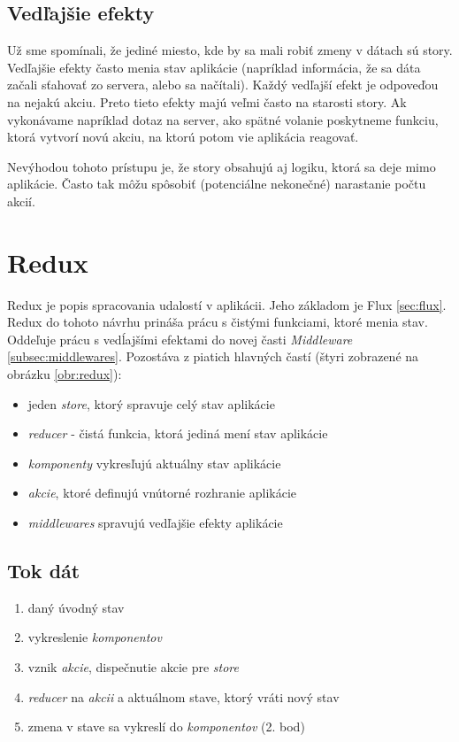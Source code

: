 \subsection{Vedľajšie efekty} 
\NEW{}
Už sme spomínali, že jediné miesto, kde by sa mali robiť zmeny v dátach sú story. Vedľajšie efekty často menia stav aplikácie (napríklad informácia, že sa dáta začali sťahovať zo servera, alebo sa načítali). Každý vedľajší efekt je odpoveďou na nejakú akciu. Preto tieto efekty majú veľmi často na starosti story. Ak vykonávame napríklad dotaz na server, ako spätné volanie poskytneme funkciu, ktorá vytvorí novú akciu, na ktorú potom vie aplikácia reagovať.

Nevýhodou tohoto prístupu je, že story obsahujú aj logiku, ktorá sa deje mimo aplikácie. Často tak môžu spôsobiť (potenciálne nekonečné) narastanie počtu akcií.










\section{Redux}
\NEW{}
Redux \cite{Redux} je popis spracovania udalostí v aplikácii. Jeho základom je Flux \ref{sec:flux}. Redux do tohoto návrhu prináša prácu s čistými funkciami, ktoré menia stav. Oddeľuje prácu s vedĺajšími efektami do novej časti \emph{Middleware} \ref{subsec:middlewares}. Pozostáva z piatich hlavných častí (štyri zobrazené na obrázku \ref{obr:redux}):
\begin{itemize}
\item jeden \emph{store}, ktorý spravuje celý stav aplikácie
\item \emph{reducer} - čistá funkcia, ktorá jediná mení stav aplikácie
\item \emph{komponenty} vykresľujú aktuálny stav aplikácie
\item \emph{akcie}, ktoré definujú vnútorné rozhranie aplikácie
\item \emph{middlewares} spravujú vedľajšie efekty aplikácie
\end{itemize}

\subsection{Tok dát}
\begin{enumerate}
\item daný úvodný stav
\item vykreslenie \emph{komponentov}
\item vznik \emph{akcie}, dispečnutie akcie pre \emph{store}
\item \emph{reducer} na \emph{akcii} a aktuálnom stave, ktorý vráti nový stav
\item zmena v stave sa vykreslí do \emph{komponentov} (2. bod)
\end{enumerate}

